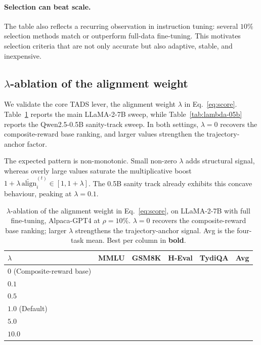 \paragraph{Selection can beat scale.}
The table also reflects a recurring observation in instruction
tuning: several $10\%$ selection methods match or outperform
full-data fine-tuning. This motivates selection criteria that are
not only accurate but also adaptive, stable, and inexpensive.

\subsection{$\lambda$-ablation of the alignment weight}
\label{sec:lambda-ablation}

We validate the core \textsc{TADS} lever, the alignment weight
$\lambda$ in Eq.~\ref{eq:score}. Table~\ref{tab:lambda-7b} reports
the main LLaMA-2-7B sweep, while Table~\ref{tab:lambda-05b}
reports the Qwen2.5-0.5B sanity-track sweep. In both settings,
$\lambda=0$ recovers the composite-reward base ranking, and
larger values strengthen the trajectory-anchor factor.

The expected pattern is non-monotonic. Small non-zero $\lambda$
adds structural signal, whereas overly large values saturate the
multiplicative boost
$1+\lambda\,\widetilde{\mathrm{align}}_i^{(t)} \in [1,1+\lambda]$.
The 0.5B sanity track already exhibits this concave behaviour,
peaking at $\lambda=0.1$.

\begin{table}[t]
\centering
\caption{$\lambda$-ablation of the alignment weight in
Eq.~\ref{eq:score}, on LLaMA-2-7B with full fine-tuning, Alpaca-GPT4
at $\rho=10\%$. $\lambda=0$ recovers the composite-reward base
ranking; larger $\lambda$ strengthens the trajectory-anchor signal.
Avg is the four-task mean. Best per column in \textbf{bold}.}
\label{tab:lambda-7b}
\begin{tabular}{lccccc}
\toprule
$\lambda$ & MMLU & GSM8K & H-Eval & TydiQA & Avg \\
\midrule
$0$ (Composite-reward base) & \STATUS{??.??} & \STATUS{??.??} & \STATUS{??.??} & \STATUS{??.??} & \STATUS{??.??} \\
$0.1$                & \STATUS{??.??} & \STATUS{??.??} & \STATUS{??.??} & \STATUS{??.??} & \STATUS{??.??} \\
$0.5$                & \STATUS{??.??} & \STATUS{??.??} & \STATUS{??.??} & \STATUS{??.??} & \STATUS{??.??} \\
$1.0$ (Default)      & \STATUS{??.??} & \STATUS{??.??} & \STATUS{??.??} & \STATUS{??.??} & \STATUS{??.??} \\
$5.0$                & \STATUS{??.??} & \STATUS{??.??} & \STATUS{??.??} & \STATUS{??.??} & \STATUS{??.??} \\
$10.0$               & \STATUS{??.??} & \STATUS{??.??} & \STATUS{??.??} & \STATUS{??.??} & \STATUS{??.??} \\
\bottomrule
\end{tabular}
\end{table}

